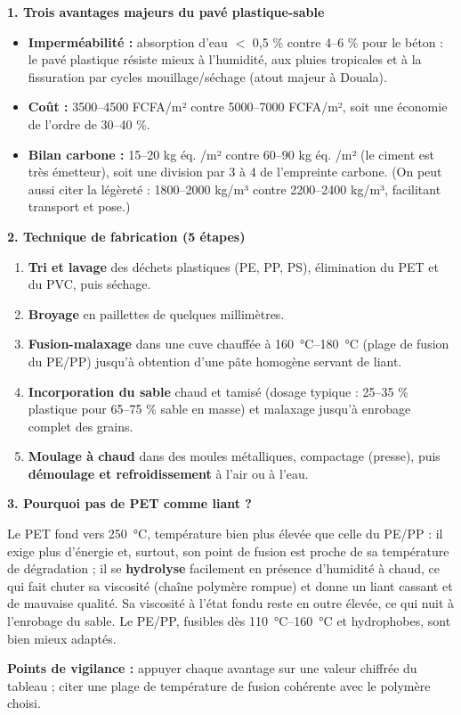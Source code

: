 \documentclass[11pt]{article}
\begin{document}
\begin{corrige}
\textbf{1. Trois avantages majeurs du pavé plastique-sable}
\begin{itemize}
    \item \textbf{Imperméabilité :} absorption d'eau $<$ 0,5 \% contre 4--6 \% pour le béton : le pavé plastique résiste mieux à l'humidité, aux pluies tropicales et à la fissuration par cycles mouillage/séchage (atout majeur à Douala).
    \item \textbf{Coût :} \num{3500}--\num{4500} FCFA/m² contre \num{5000}--\num{7000} FCFA/m², soit une économie de l'ordre de 30--40 \%.
    \item \textbf{Bilan carbone :} 15--20 kg éq. /m² contre 60--90 kg éq. /m² (le ciment est très émetteur), soit une division par 3 à 4 de l'empreinte carbone. (On peut aussi citer la légèreté : \num{1800}--\num{2000} kg/m³ contre \num{2200}--\num{2400} kg/m³, facilitant transport et pose.)
\end{itemize}

\textbf{2. Technique de fabrication (5 étapes)}
\begin{enumerate}
    \item \textbf{Tri et lavage} des déchets plastiques (PE, PP, PS), élimination du PET et du PVC, puis séchage.
    \item \textbf{Broyage} en paillettes de quelques millimètres.
    \item \textbf{Fusion-malaxage} dans une cuve chauffée à \SI{160}{\celsius}--\SI{180}{\celsius} (plage de fusion du PE/PP) jusqu'à obtention d'une pâte homogène servant de liant.
    \item \textbf{Incorporation du sable} chaud et tamisé (dosage typique : 25--35 \% plastique pour 65--75 \% sable en masse) et malaxage jusqu'à enrobage complet des grains.
    \item \textbf{Moulage à chaud} dans des moules métalliques, compactage (presse), puis \textbf{démoulage et refroidissement} à l'air ou à l'eau.
\end{enumerate}

\textbf{3. Pourquoi pas de PET comme liant ?}

Le PET fond vers \SI{250}{\celsius}, température bien plus élevée que celle du PE/PP : il exige plus d'énergie et, surtout, son point de fusion est proche de sa température de dégradation ; il se \textbf{hydrolyse} facilement en présence d'humidité à chaud, ce qui fait chuter sa viscosité (chaîne polymère rompue) et donne un liant cassant et de mauvaise qualité. Sa viscosité à l'état fondu reste en outre élevée, ce qui nuit à l'enrobage du sable. Le PE/PP, fusibles dès \SIrange{110}{160}{\celsius} et hydrophobes, sont bien mieux adaptés.

\textbf{Points de vigilance :} appuyer chaque avantage sur une valeur chiffrée du tableau ; citer une plage de température de fusion cohérente avec le polymère choisi.
\end{corrige}
\end{document}
